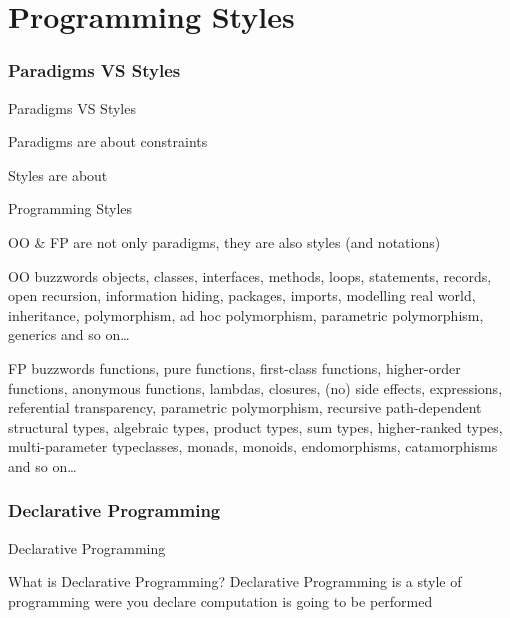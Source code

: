 \part[Programming Styles]{Programming Styles}
\section{Paradigms VS Styles}
\begin{frame}{Paradigms VS Styles}
\begin{center}
Paradigms are about \alert{constraints}
\end{center}
\begin{center}
Styles are about 
\end{center}
\end{frame}

\begin{frame}{Programming Styles}
\begin{center}
OO \& FP are not only paradigms, they are also styles (and notations)
\end{center}
\begin{block}{OO buzzwords}
objects, classes, interfaces, methods, loops, statements, records, open
recursion, information hiding, packages, imports, modelling real world,
inheritance, polymorphism, ad hoc polymorphism, parametric polymorphism,
generics and so on\ldots
\end{block}
\pause
\begin{block}{FP buzzwords}
functions, pure functions, first-class functions, higher-order functions,
anonymous functions, lambdas, closures, (no) side effects, expressions,
referential transparency, parametric polymorphism, recursive path-dependent structural
types, algebraic types, product types, sum types, higher-ranked types,
multi-parameter typeclasses, monads, monoids, endomorphisms, catamorphisms and
so on\ldots
\end{block}
\end{frame}

\section{Declarative Programming}
\begin{frame}{Declarative Programming}
\begin{block}{What is Declarative Programming?}
\pause
Declarative Programming is a style of programming were you declare
 computation is going to be performed
\end{block}
\end{frame}

